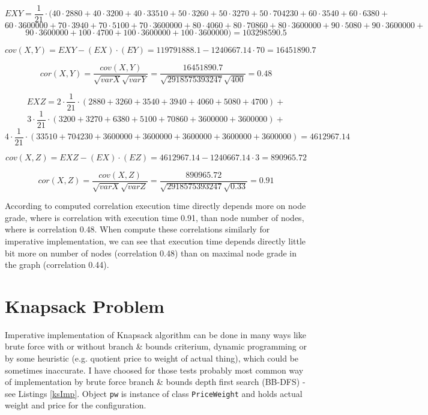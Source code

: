 \documentclass[11pt,twoside,a4paper]{book}
\begin{document}
$$EXY= \frac{1}{21}\cdot(40\cdot 2 880 + 40\cdot 3 200  + 40\cdot 33510 +
50 \cdot  3 260+ 50 \cdot   3 270+ 50 \cdot   704230 +60 \cdot   3 540 +60\cdot  
6 380+$$ $$60 \cdot   3600000  +70\cdot 
3 940 +70\cdot  5 100 +70\cdot  3600000 +80\cdot  4 060
+80\cdot 70 860 +80\cdot  3600000+90\cdot  5
080 +90\cdot  3 600 000 +$$ $$90\cdot  3600000 +100\cdot  4 700
+100\cdot  3 600 000 +100\cdot  3600000)=103298590.5$$

$$cov\left(X,Y\right)=EXY-\left(EX\right)\cdot \left(EY\right)=119791888.1
-1240667.14\cdot 70= 16451890.7$$

$$cor(X,Y)=\frac{cov(X,Y)}{\sqrt{varX}\sqrt{varY}}=\frac{16451890.7}{\sqrt{2918575393247}\sqrt{400}}=0.48$$

$$EXZ=2\cdot\frac{1}{21}\cdot\left(2880 + 3260 + 3 540 + 3 940 + 4 060 + 5 080 
+ 4 700\right)+$$
$$3\cdot\frac{1}{21}\cdot\left(3 200  + 3 270  + 6 380  + 5 100 + 70 860  + 3
600 000 + 3 600 000\right)+$$
$$4\cdot\frac{1}{21}\cdot\left(33 510   + 704 230   + 3600000  + 3600000 + 3600000 
+ 3 600 000 + 3 600 000\right) = 4612967.14$$

$$cov\left(X,Z\right)=EXZ-\left(EX\right)\cdot \left(EZ\right)=4612967.14
-1240667.14\cdot 3=890965.72$$

$$cor(X,Z)=\frac{cov(X,Z)}{\sqrt{varX}\sqrt{varZ}}=\frac{890965.72}{\sqrt{2918575393247}\sqrt{0.33}}=0.91$$

According to computed correlation execution time directly depends more on node
grade, where is correlation with execution time 0.91, than node number of nodes, where
is correlation 0.48. When compute these correlations similarly for imperative
implementation, we can see that execution time depends directly little bit more
on number of nodes (correlation 0.48) than on maximal node grade in the graph
(correlation 0.44).
\newpage
\section{Knapsack Problem}

Imperative implementation of Knapsack algorithm can be done in many ways like
brute force with or without branch \& bounds criterium, dynamic programming or
by some heuristic (e.g. quotient price to weight of actual thing), which could
be sometimes inaccurate. I have choosed for those tests probably most common way
of implementation by brute force branch \& bounds depth first search (BB-DFS) -
see Listings \ref{ksImp}. Object \verb|pw| is instance of
class \verb|PriceWeight| and holds actual weight and price for the
configuration.
\end{document}
